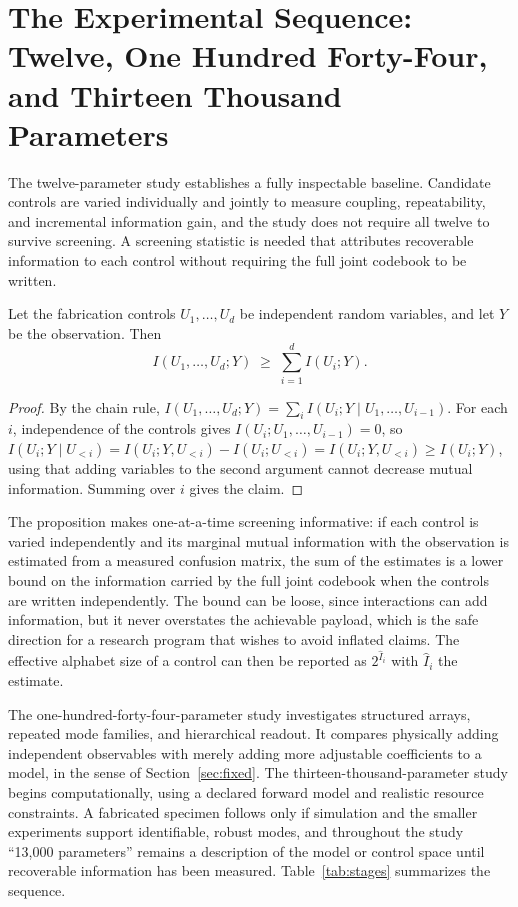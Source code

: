 \section{The Experimental Sequence: Twelve, One Hundred Forty-Four, and Thirteen Thousand Parameters}\label{sec:experiments}

The twelve-parameter study establishes a fully inspectable baseline. Candidate controls are varied individually and jointly to measure coupling, repeatability, and incremental information gain, and the study does not require all twelve to survive screening. A screening statistic is needed that attributes recoverable information to each control without requiring the full joint codebook to be written.

\begin{proposition}\label{prop:marg}
Let the fabrication controls $U_1,\dots,U_d$ be independent random variables, and let $Y$ be the observation. Then
\[
I(U_1,\dots,U_d;Y)\;\ge\;\sum_{i=1}^{d}I(U_i;Y).
\]
\end{proposition}

\begin{proof}
By the chain rule, $I(U_1,\dots,U_d;Y)=\sum_iI(U_i;Y\mid U_1,\dots,U_{i-1})$. For each $i$, independence of the controls gives $I(U_i;U_1,\dots,U_{i-1})=0$, so $I(U_i;Y\mid U_{<i})=I(U_i;Y,U_{<i})-I(U_i;U_{<i})=I(U_i;Y,U_{<i})\ge I(U_i;Y)$, using that adding variables to the second argument cannot decrease mutual information. Summing over $i$ gives the claim.
\end{proof}

The proposition makes one-at-a-time screening informative: if each control is varied independently and its marginal mutual information with the observation is estimated from a measured confusion matrix, the sum of the estimates is a lower bound on the information carried by the full joint codebook when the controls are written independently. The bound can be loose, since interactions can add information, but it never overstates the achievable payload, which is the safe direction for a research program that wishes to avoid inflated claims. The effective alphabet size of a control can then be reported as $2^{\hat I_i}$ with $\hat I_i$ the estimate.

The one-hundred-forty-four-parameter study investigates structured arrays, repeated mode families, and hierarchical readout. It compares physically adding independent observables with merely adding more adjustable coefficients to a model, in the sense of Section~\ref{sec:fixed}. The thirteen-thousand-parameter study begins computationally, using a declared forward model and realistic resource constraints. A fabricated specimen follows only if simulation and the smaller experiments support identifiable, robust modes, and throughout the study ``13,000 parameters'' remains a description of the model or control space until recoverable information has been measured. Table~\ref{tab:stages} summarizes the sequence.

